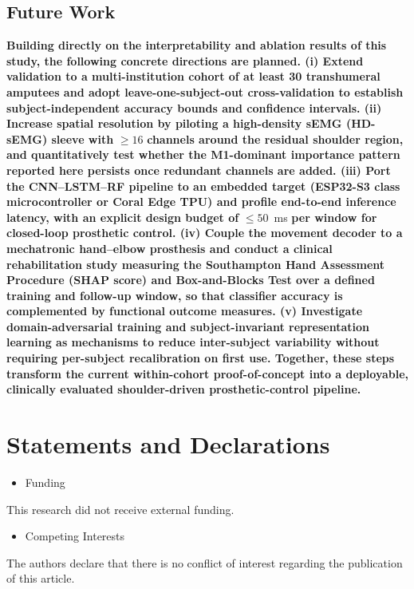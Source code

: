 \documentclass{elektr}
\newcommand{\yh}[1]{{\color{revhi}\textbf{#1}}}
\begin{document}
\subsection*{Future Work}
\yh{Building directly on the interpretability and ablation results of this study, the following concrete directions are planned. (i) Extend validation to a multi-institution cohort of at least 30 transhumeral amputees and adopt leave-one-subject-out cross-validation to establish subject-independent accuracy bounds and confidence intervals. (ii) Increase spatial resolution by piloting a high-density sEMG (HD-sEMG) sleeve with }$\ge 16$\yh{ channels around the residual shoulder region, and quantitatively test whether the M1-dominant importance pattern reported here persists once redundant channels are added. (iii) Port the CNN--LSTM--RF pipeline to an embedded target (ESP32-S3 class microcontroller or Coral Edge TPU) and profile end-to-end inference latency, with an explicit design budget of }$\le 50$~ms\yh{ per window for closed-loop prosthetic control. (iv) Couple the movement decoder to a mechatronic hand--elbow prosthesis and conduct a clinical rehabilitation study measuring the Southampton Hand Assessment Procedure (SHAP score) and Box-and-Blocks Test over a defined training and follow-up window, so that classifier accuracy is complemented by functional outcome measures. (v) Investigate domain-adversarial training and subject-invariant representation learning as mechanisms to reduce inter-subject variability without requiring per-subject recalibration on first use. Together, these steps transform the current within-cohort proof-of-concept into a deployable, clinically evaluated shoulder-driven prosthetic-control pipeline.}

\section{Statements and Declarations}
\begin{itemize}
	\item Funding
\end{itemize}
This research did not receive external funding.
\begin{itemize}
	\item Competing Interests
\end{itemize}
The authors declare that there is no conflict of interest regarding the publication of this article.
\end{document}
